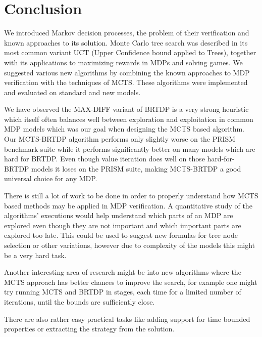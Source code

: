 \chapter{Conclusion}

We introduced Markov decision processes,
the problem of their verification and known approaches to its solution.
Monte Carlo tree search was described in its most common variant UCT
(Upper Confidence bound applied to Trees),
together with its applications to maximizing rewards in MDPs and solving
games.
We suggested various new algorithms by combining the known
approaches to MDP verification with the techniques of MCTS. These
algorithms were implemented and evaluated on standard and new models.

We have observed the MAX-DIFF variant of BRTDP is a very strong
heuristic which itself often balances well between exploration and
exploitation in common MDP models which was our goal when designing the
MCTS based algorithm. Our MCTS-BRTDP algorithm
performs only slightly worse on the PRISM benchmark suite while it
performs significantly better on many models which are hard for BRTDP.
Even though value iteration does well on those hard-for-BRTDP models it
loses on the PRISM suite, making MCTS-BRTDP a good universal choice for
any MDP.

There is still a lot of work to be done in order to properly understand
how MCTS based methods may be applied in MDP verification. A
quantitative study of the algorithms' executions would help understand
which parts
of an MDP are explored even though they are not important and which
important parts are explored too late. This could be used to suggest new
formulas for tree node selection or other variations, however due to
complexity of the models this might be a very hard task.

Another interesting area of research might be into
new algorithms where the MCTS approach has better chances to
improve the search, for example one might try running MCTS and BRTDP in
stages, each time for a limited number of iterations, until the bounds
are sufficiently close.

There
are also rather easy practical tasks like adding support for time
bounded properties or extracting the strategy from the
solution.
